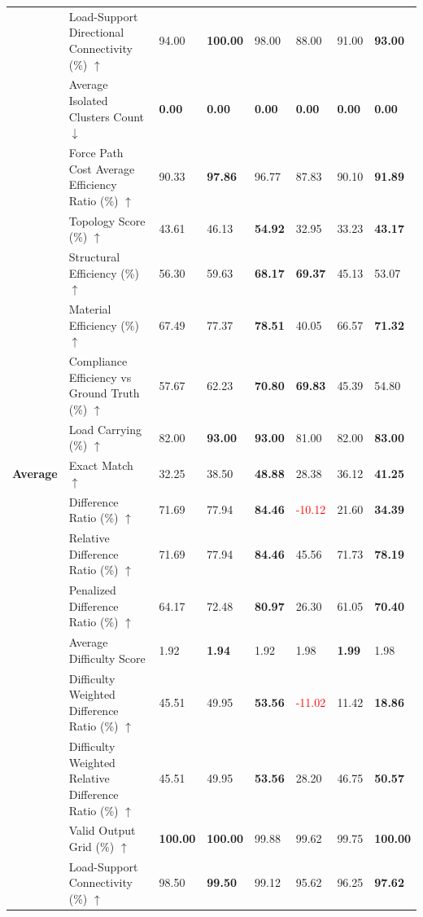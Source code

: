 \begin{table}[!h]
{\begin{tabular}{lllll|lll}
 & Load-Support Directional Connectivity (\%) $\uparrow$ & 94.00 & \textbf{100.00} & 98.00 & 88.00 & 91.00 & \textbf{93.00} \\
 & Average Isolated Clusters Count $\downarrow$ & \textbf{0.00} & \textbf{0.00} & \textbf{0.00} & \textbf{0.00} & \textbf{0.00} & \textbf{0.00} \\
 & Force Path Cost Average Efficiency Ratio (\%) $\uparrow$ & 90.33 & \textbf{97.86} & 96.77 & 87.83 & 90.10 & \textbf{91.89} \\
 & Topology Score (\%) $\uparrow$ & 43.61 & 46.13 & \textbf{54.92} & 32.95 & 33.23 & \textbf{43.17} \\
 & Structural Efficiency (\%) $\uparrow$ & 56.30 & 59.63 & \textbf{68.17} & \textbf{69.37} & 45.13 & 53.07 \\
 & Material Efficiency (\%) $\uparrow$ & 67.49 & 77.37 & \textbf{78.51} & 40.05 & 66.57 & \textbf{71.32} \\
 & Compliance Efficiency vs Ground Truth (\%) $\uparrow$ & 57.67 & 62.23 & \textbf{70.80} & \textbf{69.83} & 45.39 & 54.80 \\
 & Load Carrying (\%) $\uparrow$ & 82.00 & \textbf{93.00} & \textbf{93.00} & 81.00 & 82.00 & \textbf{83.00} \\
\midrule
\textbf{Average} & Exact Match $\uparrow$ & 32.25 & 38.50 & \textbf{48.88} & 28.38 & 36.12 & \textbf{41.25} \\
 & Difference Ratio (\%) $\uparrow$ & 71.69 & 77.94 & \textbf{84.46} & \textcolor{red}{-10.12} & 21.60 & \textbf{34.39} \\
 & Relative Difference Ratio (\%) $\uparrow$ & 71.69 & 77.94 & \textbf{84.46} & 45.56 & 71.73 & \textbf{78.19} \\
 & Penalized Difference Ratio (\%) $\uparrow$ & 64.17 & 72.48 & \textbf{80.97} & 26.30 & 61.05 & \textbf{70.40} \\
 & Average Difficulty Score & 1.92 & \textbf{1.94} & 1.92 & 1.98 & \textbf{1.99} & 1.98 \\
 & Difficulty Weighted Difference Ratio (\%) $\uparrow$ & 45.51 & 49.95 & \textbf{53.56} & \textcolor{red}{-11.02} & 11.42 & \textbf{18.86} \\
 & Difficulty Weighted Relative Difference Ratio (\%) $\uparrow$ & 45.51 & 49.95 & \textbf{53.56} & 28.20 & 46.75 & \textbf{50.57} \\
 & Valid Output Grid (\%) $\uparrow$ & \textbf{100.00} & \textbf{100.00} & 99.88 & 99.62 & 99.75 & \textbf{100.00} \\
 & Load-Support Connectivity (\%) $\uparrow$ & 98.50 & \textbf{99.50} & 99.12 & 95.62 & 96.25 & \textbf{97.62} \\

\end{tabular}}
\end{table}
